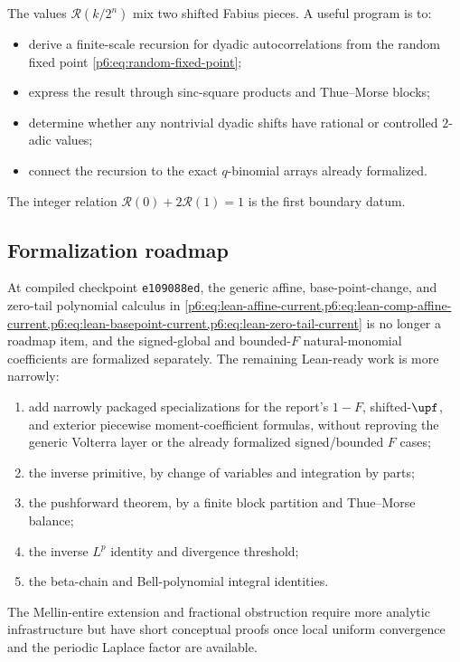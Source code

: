 \documentclass[11pt,oneside]{article}
\theoremstyle{definition}
\theoremstyle{remark}
\newcommand{\1}{\mathbf 1}
\begin{document}
The values \(\mathcal R(k/2^n)\) mix two shifted Fabius pieces.  A useful program is to:
\begin{itemize}
  \item derive a finite-scale recursion for dyadic autocorrelations from the random fixed
        point \eqref{p6:eq:random-fixed-point};
  \item express the result through sinc-square products and Thue--Morse blocks;
  \item determine whether any nontrivial dyadic shifts have rational or controlled
        \(2\)-adic values;
  \item connect the recursion to the exact \(q\)-binomial arrays already formalized.
\end{itemize}
The integer relation \(\mathcal R(0)+2\mathcal R(1)=1\) is the first boundary datum.

\subsection{Formalization roadmap}

At compiled checkpoint \texttt{e109088ed}, the generic affine, base-point-change, and
zero-tail polynomial calculus in
\cref{p6:eq:lean-affine-current,p6:eq:lean-comp-affine-current,p6:eq:lean-basepoint-current,p6:eq:lean-zero-tail-current}
is no longer a roadmap item, and the signed-global and bounded-\(F\) natural-monomial
coefficients are formalized separately.  The remaining Lean-ready work is more narrowly:
\begin{enumerate}
  \item add narrowly packaged specializations for the report's \(1-F\), shifted-\(\upf\),
        and exterior piecewise moment-coefficient formulas, without reproving the generic
        Volterra layer or the already formalized signed/bounded \(F\) cases;
  \item the inverse primitive, by change of variables and integration by parts;
  \item the pushforward theorem, by a finite block partition and Thue--Morse balance;
  \item the inverse \(L^p\) identity and divergence threshold;
  \item the beta-chain and Bell-polynomial integral identities.
\end{enumerate}
The Mellin-entire extension and fractional obstruction require more analytic
infrastructure but have short conceptual proofs once local uniform convergence and the
periodic Laplace factor are available.
\end{document}
